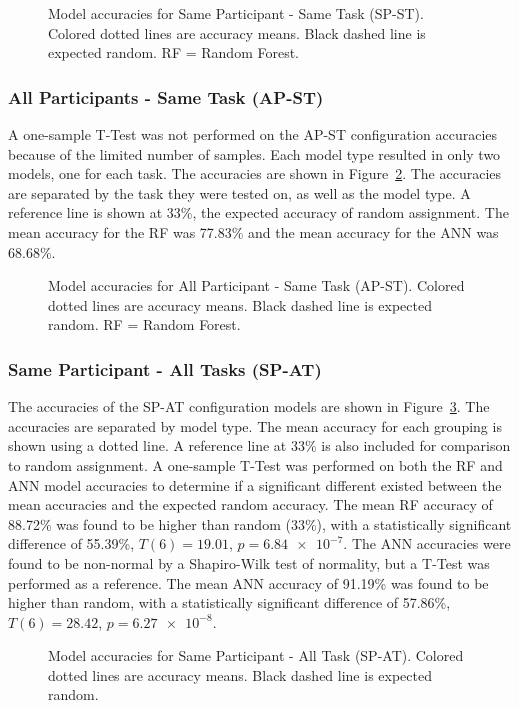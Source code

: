 \documentclass[11pt]{article}
\begin{document}
		\begin{figure}
		\centering
		\caption[Same Participant - Same Task (SP-ST) Model Accuracies]{ Model accuracies for Same Participant - Same Task (SP-ST). Colored dotted lines are accuracy means. Black dashed line is expected random. RF = Random Forest. }
		\label{fig:sp-st}
		\end{figure} 
		
		\subsubsection{All Participants - Same Task (AP-ST)}
		A one-sample T-Test was not performed on the AP-ST configuration accuracies because of the limited number of samples. Each model type resulted in only two models, one for each task. The accuracies are shown in Figure~\ref{fig:ap-st}. The accuracies are separated by the task they were tested on, as well as the model type. A reference line is shown at 33\%, the expected accuracy of random assignment. The mean accuracy for the RF was 77.83\% and the mean accuracy for the ANN was 68.68\%.
		\begin{figure}
		\centering
		\caption[All Participant - Same Task (AP-ST) Model Accuracies]{ Model accuracies for All Participant - Same Task (AP-ST). Colored dotted lines are accuracy means. Black dashed line is expected random. RF = Random Forest. }
		\label{fig:ap-st}
		\end{figure} 
		
		\subsubsection{Same Participant - All Tasks (SP-AT)}
		The accuracies of the SP-AT configuration models are shown in Figure~\ref{fig:sp-at}. The accuracies are separated by model type. The mean accuracy for each grouping is shown using a dotted line. A reference line at 33\% is also included for comparison to random assignment. A one-sample T-Test was performed on both the RF and ANN model accuracies to determine if a significant different existed between the mean accuracies and the expected random accuracy. The mean RF accuracy of 88.72\% was found to be higher than random (33\%), with a statistically significant difference of 55.39\%, \(T(6) = 19.01\), \(p = \num{6.84e-7}\). The ANN accuracies were found to be non-normal by a Shapiro-Wilk test of normality, but a T-Test was performed as a reference. The mean ANN accuracy of 91.19\% was found to be higher than random, with a statistically significant difference of 57.86\%, \(T(6) = 28.42\), \(p = \num{6.27e-8}\).
		\begin{figure}
		\centering
		\caption[Same Participant - All Task (SP-AT) Model Accuracies]{ Model accuracies for Same Participant - All Task (SP-AT). Colored dotted lines are accuracy means. Black dashed line is expected random. }
		\label{fig:sp-at}
		\end{figure} 
		
\end{document}
